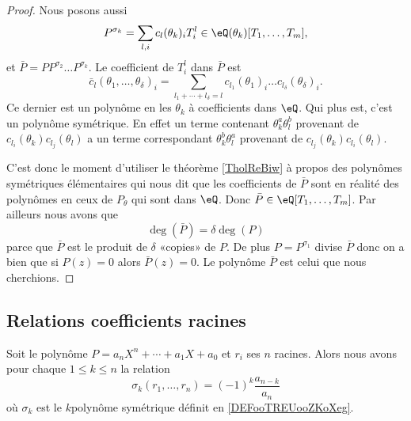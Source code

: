 \begin{proof}
    Nous posons aussi
    \begin{equation}
        P^{\sigma_k}=\sum_{l,i} c_l(\theta_k)_iT_i^l\in \eQ(\theta_k)[T_1,\ldots, T_m],
    \end{equation}
    et \( \bar P=PP^{\sigma_2}\ldots P^{\sigma_k}\). Le coefficient de \( T_i^l\) dans \( \bar P\) est
    \begin{equation}
        \bar c_l(\theta_1,\ldots, \theta_{\delta})_i=\sum_{l_1+\cdots +l_{\delta}=l}c_{l_1}(\theta_1)_i\ldots c_{l_{\delta}}(\theta_{\delta})_i.
    \end{equation}
    Ce dernier est un polynôme en les \( \theta_k\) à coefficients dans \( \eQ\). Qui plus est, c'est un polynôme symétrique. En effet un terme contenant \( \theta_k^a\theta_l^b\) provenant de \( c_{l_i}(\theta_k)c_{l_j}(\theta_l)\) a un terme correspondant \( \theta_k^b\theta_l^a\) provenant de \( c_{l_j}(\theta_k)c_{l_i}(\theta_l)\).

    C'est donc le moment d'utiliser le théorème \ref{TholReBiw} à propos des polynômes symétriques élémentaires qui nous dit que les coefficients de \( \bar P\) sont en réalité des polynômes en ceux de \( P_{\theta}\) qui sont dans \( \eQ\). Donc \( \bar P\in \eQ[T_1,\ldots, T_m]\). Par ailleurs nous avons que
    \begin{equation}
        \deg(\bar P)=\delta \deg(P)
    \end{equation}
    parce que \( \bar P\) est le produit de \( \delta\) «copies»  de \( P\). De plus \( P=P^{\sigma_1}\) divise \( \bar P \) donc on a bien que si \( P(z)=0\) alors \( \bar P(z)=0\). Le polynôme \( \bar P\) est celui que nous cherchions. 
\end{proof}

\subsection{Relations coefficients racines}

\begin{theorem} \label{ThoOQRgjpl}
    Soit le polynôme \( P=a_nX^n+\cdots +a_1X+a_0\) et \( r_i\) ses \( n\) racines. Alors nous avons pour chaque \( 1\leq k\leq n\) la relation
    \begin{equation}
        \sigma_k(r_1,\ldots, r_n)=(-1)^k\frac{ a_{n-k} }{ a_n }
    \end{equation}
    où \( \sigma_k\) est le \( k\)\ieme polynôme symétrique définit en \ref{DEFooTREUooZKoXeg}.
\end{theorem}


